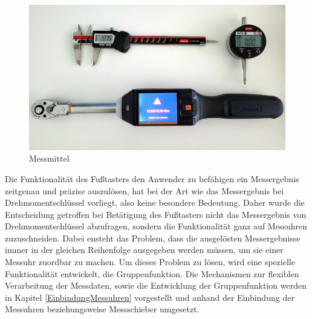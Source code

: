 \begin{figure}[H] 
	\centering
	\includegraphics[width=\textwidth]{figures/Messmittel.jpg}
	\caption{Messmittel}
	\label{fig:Messmittel}
\end{figure}
Die Funktionalität des Fußtasters den Anwender zu befähigen ein Messergebnis zeitgenau und präzise auszulösen, hat bei der Art wie das Messergebnis bei Drehmomentschlüssel vorliegt, also keine besondere Bedeutung. Daher wurde die Entscheidung getroffen bei Betätigung des Fußtasters nicht das Messergebnis von Drehmomentschlüssel abzufragen, sondern die Funktionalität ganz auf Messuhren zuzuschneiden. Dabei ensteht das Problem, dass die ausgelösten Messergebnisse immer in der gleichen Reihenfolge ausgegeben werden müssen, um sie einer Messuhr zuordbar zu machen. Um dieses Problem zu lösen, wird eine spezielle Funktionalität entwickelt, die Gruppenfunktion. Die Mechanismen zur flexiblen Verarbeitung der Messdaten, sowie die Entwicklung der Gruppenfunktion werden in Kapitel \ref{EinbindungMessuhren} vorgestellt und anhand der Einbindung der Messuhren beziehungsweise Messschieber umgesetzt.

